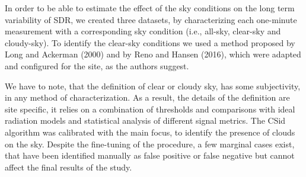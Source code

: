 \documentclass[
  preprint, 3p, authoryear]{article}
\begin{document}
In order to be able to estimate the effect of the sky conditions on the long term variability of SDR, we created three datasets, by characterizing each one-minute measurement with a corresponding sky condition (i.e., all-sky, clear-sky and cloudy-sky).
To identify the clear-sky conditions we used a method proposed by
Long and Ackerman (2000)
and by
Reno and Hansen (2016),
which were adapted and configured for the site, as the authors suggest.

We have to note, that the definition of clear or cloudy sky, has some subjectivity, in any method of characterization.
As a result, the details of the definition are site specific, it relies on a combination of thresholds and comparisons with ideal radiation models and statistical analysis of different signal metrics.
The CSid algorithm was calibrated with the main focus, to identify the presence of clouds on the sky.
Despite the fine-tuning of the procedure, a few marginal cases exist, that have been identified manually as false positive or false negative but cannot affect the final results of the study.
\end{document}
